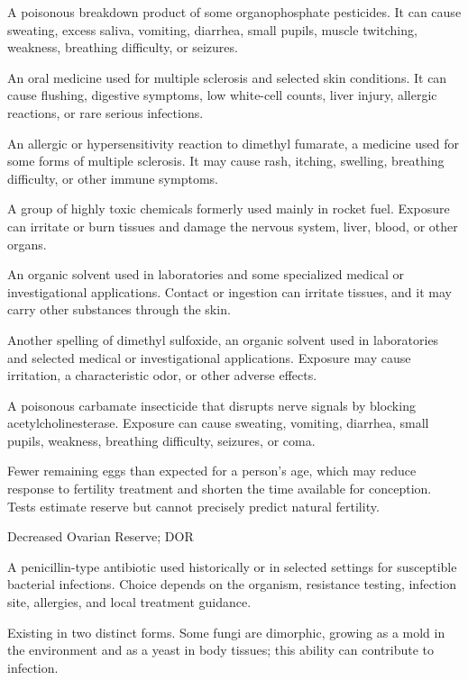  A poisonous breakdown product of some organophosphate pesticides. It can cause sweating, excess saliva, vomiting, diarrhea, small pupils, muscle twitching, weakness, breathing difficulty, or seizures.

 An oral medicine used for multiple sclerosis and selected skin conditions. It can cause flushing, digestive symptoms, low white-cell counts, liver injury, allergic reactions, or rare serious infections.

 An allergic or hypersensitivity reaction to dimethyl fumarate, a medicine used for some forms of multiple sclerosis. It may cause rash, itching, swelling, breathing difficulty, or other immune symptoms.

 A group of highly toxic chemicals formerly used mainly in rocket fuel. Exposure can irritate or burn tissues and damage the nervous system, liver, blood, or other organs.

 An organic solvent used in laboratories and some specialized medical or investigational applications. Contact or ingestion can irritate tissues, and it may carry other substances through the skin.

 Another spelling of dimethyl sulfoxide, an organic solvent used in laboratories and selected medical or investigational applications. Exposure may cause irritation, a characteristic odor, or other adverse effects.

 A poisonous carbamate insecticide that disrupts nerve signals by blocking acetylcholinesterase. Exposure can cause sweating, vomiting, diarrhea, small pupils, weakness, breathing difficulty, seizures, or coma.

 Fewer remaining eggs than expected for a person’s age, which may reduce response to fertility treatment and shorten the time available for conception. Tests estimate reserve but cannot precisely predict natural fertility.

\synonyms
Decreased Ovarian Reserve; DOR

 A penicillin-type antibiotic used historically or in selected settings for susceptible bacterial infections. Choice depends on the organism, resistance testing, infection site, allergies, and local treatment guidance.

 Existing in two distinct forms. Some fungi are dimorphic, growing as a mold in the environment and as a yeast in body tissues; this ability can contribute to infection.

